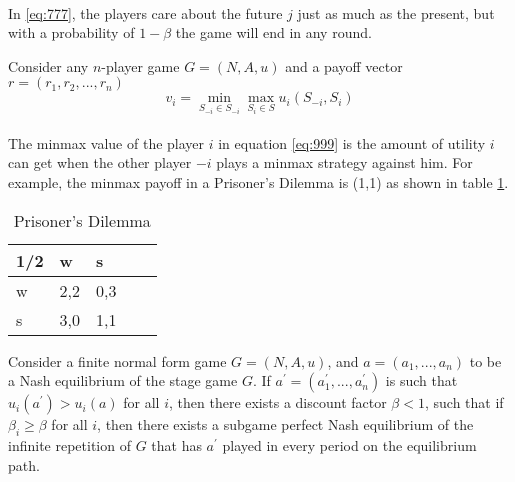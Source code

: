 \paragraph{}In \ref{eq:777}, the players care about the future $j$ just as much as the present, but with a probability of $1 - \beta$ the game will end in any round.
\begin{mydef}\label{def:def888}
Consider any $n$-player game $G = (N,A,u)$ and a payoff vector $r = (r_1, r_2, ..., r_n)$
 \begin{equation}\label{eq:999}
	v_i = \min_{S_{-i} \in S_{-i}} \max_{S_i \in S} u_i (S_{-i}, S_i)
\end{equation}
\end{mydef}
\paragraph{} The minmax value of the player $i$ in equation \ref{eq:999} is the amount of utility $i$ can get when the other player $-i$ plays a minmax strategy against him. For example, the minmax payoff in a Prisoner's Dilemma  is (1,1) as shown in table \ref{table:7}.
\begin{table}[h!]
\centering
\begin{tabular}{lllll}

\multicolumn{1}{l}{1/2} \vline  & \multicolumn{1}{l}{w} & \multicolumn{1}{l}{s}  \\ 
\hline
w                          & 2,2                                  & 0,3				
\\
s                          &3,0                                    & 1,1                                     
                                      
\end{tabular}
\caption{Prisoner's Dilemma}
\label{table:7}
\end{table}

\begin{mydef}
Consider a finite normal form game $G = (N, A, u)$, and $a = (a_1, ...,a_n )$ to be a Nash equilibrium of the stage game $G$. If $a^\prime = (a^\prime_1, ..., a^\prime_n)$ is such that $u_i(a^\prime)> u_i(a)$ for all $i$, then there exists a discount factor $\beta <1$, such that if $\beta_i \geq \beta$ for all $i$, then there exists a subgame perfect Nash equilibrium of the infinite repetition of $G$ that has $a^\prime$ played in every period on the equilibrium path.
\end{mydef}
